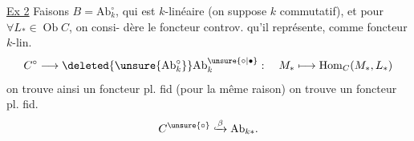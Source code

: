 \uline{Ex 2} Faisons $B=\mathrm{Ab}_k^\circ$,
qui est $k$-linéaire (on suppose
$k$ commutatif), et pour $\forall L_*\in\operatorname{Ob}C$, on consi-
dère le foncteur controv. qu'il représente, 
comme foncteur $k$-lin.
\[
C^\circ\longrightarrow\deleted{\unsure{\mathrm{Ab}^\circ_k}}\mathrm{Ab}_k^{\unsure{\circ|\bullet}}:
\quad M_*\longmapsto\operatorname{Hom}_C(M_*,L_*)
\]
on trouve ainsi un foncteur pl. fid (pour la
même raison)
on trouve un foncteur pl. fid.
\[
C^{\unsure{\circ}}\lhook\joinrel\xrightarrow{\beta}\mathrm{Ab}_{k*}.
\]
